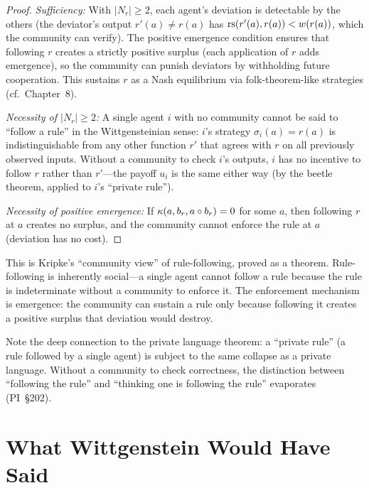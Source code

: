 \begin{proof}
\emph{Sufficiency:} With $|N_r| \ge 2$, each agent's deviation
is detectable by the others (the deviator's output $r'(a) \ne r(a)$
has $\mathrm{rs}(r'(a), r(a)) < w(r(a))$, which the community can verify).
The positive emergence condition ensures that following $r$ creates
a strictly positive surplus (each application of $r$ adds emergence),
so the community can punish deviators by withholding future
cooperation.  This sustains $r$ as a Nash equilibrium via
folk-theorem-like strategies (cf.\ Chapter~8).

\emph{Necessity of $|N_r| \ge 2$:} A single agent $i$ with no
community cannot be said to ``follow a rule'' in the Wittgensteinian
sense: $i$'s strategy $\sigma_i(a) = r(a)$ is indistinguishable
from any other function $r'$ that agrees with $r$ on all previously
observed inputs.  Without a community to check $i$'s outputs,
$i$ has no incentive to follow $r$ rather than $r'$---the payoff
$u_i$ is the same either way (by the beetle theorem, applied to
$i$'s ``private rule'').

\emph{Necessity of positive emergence:} If $\kappa(a, b_r,
a \circ b_r) = 0$ for some $a$, then following $r$ at $a$
creates no surplus, and the community cannot enforce the rule
at $a$ (deviation has no cost).
\end{proof}

\begin{interpretation}
This is Kripke's ``community view'' of rule-following, proved
as a theorem.  Rule-following is inherently social---a single
agent cannot follow a rule because the rule is indeterminate
without a community to enforce it.  The enforcement mechanism
is emergence: the community can sustain a rule only because
following it creates a positive surplus that deviation would
destroy.

Note the deep connection to the private language theorem:
a ``private rule'' (a rule followed by a single agent) is
subject to the same collapse as a private language.  Without
a community to check correctness, the distinction between
``following the rule'' and ``thinking one is following the
rule'' evaporates (PI~\S202).
\end{interpretation}

\section{What Wittgenstein Would Have Said}
\label{sec:wittgenstein-would}

